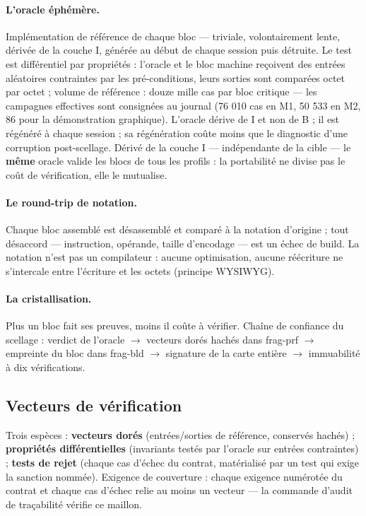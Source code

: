 \paragraph{L’oracle éphémère.} Implémentation de référence de chaque bloc — triviale,
volontairement lente, dérivée de la couche I, générée au début de chaque session puis
détruite. Le test est différentiel par propriétés : l’oracle et le bloc machine reçoivent
des entrées aléatoires contraintes par les pré-conditions, leurs sorties sont comparées
octet par octet ; volume de référence : douze mille cas par bloc critique — les campagnes
effectives sont consignées au journal (76 010 cas en M1, 50 533 en M2, 86 pour la
démonstration graphique). L’oracle dérive
de I et non de B ; il est régénéré à chaque session ; sa régénération coûte moins que le
diagnostic d’une corruption post-scellage. Dérivé de la couche I — indépendante de la
cible — le \textbf{même} oracle valide les blocs de tous les profils : la portabilité ne
divise pas le coût de vérification, elle le mutualise.

\paragraph{Le round-trip de notation.} Chaque bloc assemblé est désassemblé et comparé à
la notation d’origine ; tout désaccord — instruction, opérande, taille d’encodage — est un
échec de build. La notation n’est pas un compilateur : aucune optimisation, aucune
réécriture ne s’intercale entre l’écriture et les octets (principe WYSIWYG).

\paragraph{La cristallisation.} Plus un bloc fait ses preuves, moins il coûte à vérifier.
Chaîne de confiance du scellage : verdict de l’oracle $\to$ vecteurs dorés hachés dans
frag-prf $\to$ empreinte du bloc dans frag-bld $\to$ signature de la carte entière $\to$
immuabilité à dix vérifications.

\subsection{Vecteurs de vérification}\label{sec:vecteurs}

Trois espèces : \textbf{vecteurs dorés} (entrées/sorties de référence, conservés hachés) ;
\textbf{propriétés différentielles} (invariants testés par l’oracle sur entrées
contraintes) ; \textbf{tests de rejet} (chaque cas d’échec du contrat, matérialisé par un
test qui exige la sanction nommée). Exigence de couverture : chaque exigence numérotée du
contrat et chaque cas d’échec relie au moins un vecteur — la commande d’audit de
traçabilité vérifie ce maillon.


